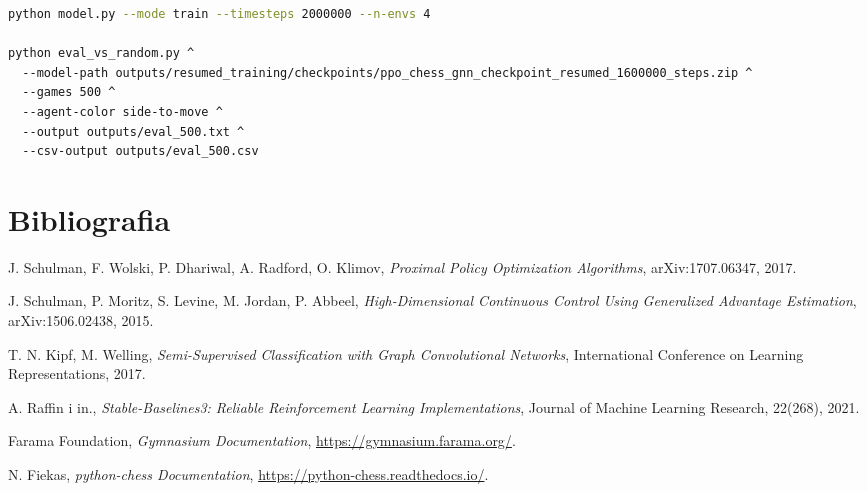 \documentclass[12pt,a4paper]{article}
\begin{document}
\begin{lstlisting}[language=bash,caption={Przykładowy trening i ewaluacja.}]
python model.py --mode train --timesteps 2000000 --n-envs 4

python eval_vs_random.py ^
  --model-path outputs/resumed_training/checkpoints/ppo_chess_gnn_checkpoint_resumed_1600000_steps.zip ^
  --games 500 ^
  --agent-color side-to-move ^
  --output outputs/eval_500.txt ^
  --csv-output outputs/eval_500.csv
\end{lstlisting}

\section*{Bibliografia}

\begin{thebibliography}{9}

J. Schulman, F. Wolski, P. Dhariwal, A. Radford, O. Klimov,
\textit{Proximal Policy Optimization Algorithms}, arXiv:1707.06347, 2017.

J. Schulman, P. Moritz, S. Levine, M. Jordan, P. Abbeel,
\textit{High-Dimensional Continuous Control Using Generalized Advantage Estimation},
arXiv:1506.02438, 2015.

T. N. Kipf, M. Welling,
\textit{Semi-Supervised Classification with Graph Convolutional Networks},
International Conference on Learning Representations, 2017.

A. Raffin i in.,
\textit{Stable-Baselines3: Reliable Reinforcement Learning Implementations},
Journal of Machine Learning Research, 22(268), 2021.

Farama Foundation,
\textit{Gymnasium Documentation},
\url{https://gymnasium.farama.org/}.

N. Fiekas,
\textit{python-chess Documentation},
\url{https://python-chess.readthedocs.io/}.

\end{thebibliography}
\end{document}
